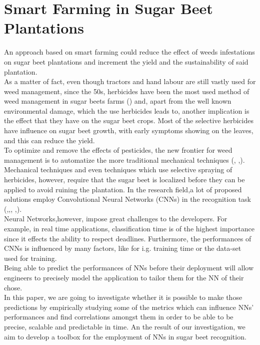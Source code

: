 \section{Smart Farming in Sugar Beet Plantations}
An approach based on smart farming could reduce the effect of weeds infestations on sugar beet plantations and  increment the yield and the sustainability of said plantation.\\
As a matter of fact, even though tractors and hand labour are still vastly used for weed management, since the 50s, herbicides have been the most used method of weed management in sugar beets farms (\cite{cioni_weed_2010}) and, apart from the well known environmental damage, which the use herbicides leads to, another implication is the effect that they have on the sugar beet crops. Most of the selective herbicides have influence on sugar beet growth, with early symptoms showing on the leaves, and this can reduce the yield. \cite{petersen_review_2004}\\
To optimize and remove the effects of pesticides, the new frontier for weed management is to automatize the more traditional mechanical techniques (\cite{raja_real-time_2020}, \cite{frasconi_design_2014},\cite{machleb_sensor-based_2021}).\\
Mechanical techniques and even techniques which use selective spraying of herbicides, however, require that the sugar beet is localized before they can be applied to avoid ruining the plantation. In the research field,a lot of proposed solutions employ Convolutional Neural Networks (CNNs) in the recognition task (\cite{gao_deep_2020},\cite{suh_transfer_2018},\cite{ramirez_deep_2020}, \cite{milioto2017real},\cite{agriculture11111111}).\\
Neural Networks,however, impose great challenges to the developers. For example, in real time applications, classification time is of the highest importance since it effects the ability to respect deadlines. Furthermore, the performances of CNNs is influenced by many factors, like for i.g. training time or the data-set used for training.\\ %
Being able to predict the performances of NNs before their deployment will allow engineers to precisely model the application to tailor them for the NN of their chose. \\
In this paper, we are going to investigate whether it is possible to make those predictions by empirically studying some of the metrics which can influence NNs' performances and find correlations amongst them in order to be able to be precise, scalable and predictable in time. An the result of our investigation, we aim to develop a toolbox for the employment of NNs in sugar beet recognition.
